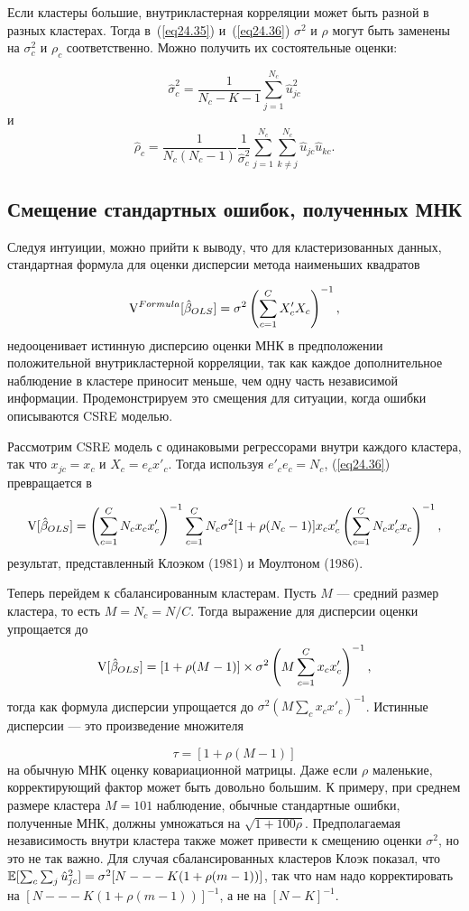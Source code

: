 Если кластеры большие, внутрикластерная корреляции может быть разной в разных кластерах. Тогда в~(\ref{eq24.35}) и~(\ref{eq24.36}) $\sigma^2$ и $\rho$ могут быть заменены на $\sigma^2_c$ и $\rho_c$ соответственно. Можно получить их состоятельные оценки:

$$
\hat \sigma^2_c = \frac{1}{N_c-K-1}\sum_{j=1}^{N_c} \hat u^2_{jc}
$$
и
$$
\hat \rho_c = \frac{1}{N_c (N_c -1)} \frac{1}{\hat \sigma^2_c} \sum_{j=1}^{N_c} \sum_{k \ne j}^{N_c} \hat u_{jc} \hat u_{kc}.
$$

\subsection*{Смещение стандартных ошибок, полученных МНК}

Следуя интуиции, можно прийти к выводу, что для кластеризованных данных, стандартная формула для оценки дисперсии метода наименьших квадратов

$$
\mathrm{V}^{Formula}[\hat \beta_{OLS}] = \sigma^2 \left( \sum_{c=1}^C X'_c X_c \right)^{-1},
$$
недооценивает истинную дисперсию оценки МНК в предположении положительной внутрикластерной корреляции, так как каждое дополнительное наблюдение в кластере приносит меньше, чем одну часть независимой информации. Продемонстрируем это смещения для ситуации, когда ошибки описываются CSRE моделью. 

Рассмотрим CSRE модель с одинаковыми регрессорами внутри каждого кластера, так что $x_{jc} = x_c$ и $X_c = e_c x'_c$. Тогда используя $e'_c e_c = N_c$, (\ref{eq24.36}) превращается в

$$
\mathrm{V}[\hat \beta_{OLS}] = \left( \sum_{c=1}^C N_c x_c x'_c \right)^{-1} \sum_{c=1}^C N_c \sigma^2 [1+ \rho(N_c -1)] x_c x'_c \left( \sum_{c=1}^C N_c x'_c x_c \right)^{-1},
$$
результат, представленный Клоэком (1981) и Моултоном (1986).

Теперь перейдем к сбалансированным кластерам. Пусть $M$ --- средний размер кластера, то есть $M = N_c = N/C$. Тогда выражение для дисперсии оценки упрощается до
$$
\mathrm{V}[\hat{\beta}_{OLS}] = [1+\rho (M-1)] \times \sigma^2 \left( M \sum_{c=1}^C x_c x_c'  \right)^{-1},
$$
тогда как формула дисперсии упрощается до $\sigma^2 (M \sum_c x_c x'_c)^{-1}$. Истинные дисперсии --- это произведение множителя

$$
\tau = [1+\rho (M-1)]
$$
на обычную МНК оценку ковариационной матрицы. Даже если $\rho$ маленькие, корректирующий фактор может быть довольно большим. К примеру, при среднем размере кластера $M = 101$ наблюдение, обычные стандартные ошибки, полученные МНК, должны умножаться на $\sqrt{1+100\rho}$. Предполагаемая независимость внутри кластера также может привести к смещению оценки $\sigma^2$, но это не так важно. Для случая сбалансированных кластеров Клоэк показал, что $\mathbb{E}[\sum_c \sum_j \hat u^2_{jc}] = \sigma^2 [N --- K(1+\rho(m-1))]$, так что нам надо корректировать на $[N --- K(1+\rho(m-1))]^{-1}$, а не на $[N-K]^{-1}$. 

